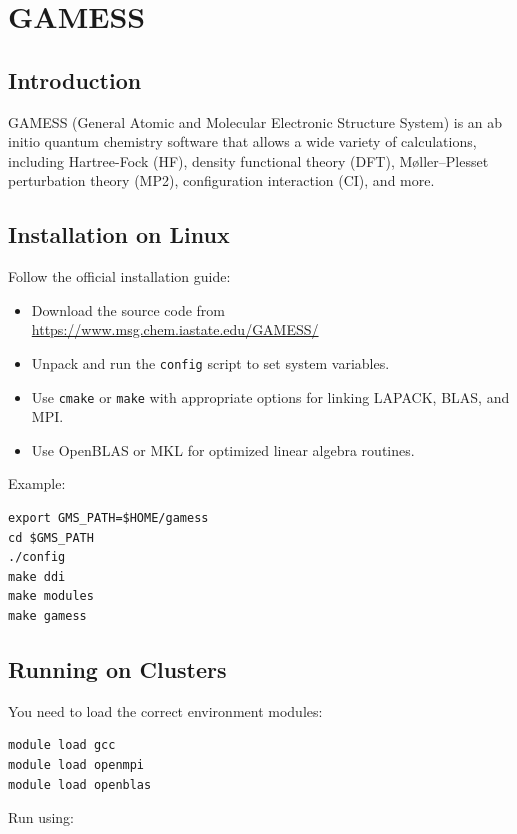 \chapter{GAMESS}

\section{Introduction}

GAMESS (General Atomic and Molecular Electronic Structure System) is an ab initio quantum chemistry software that allows a wide variety of calculations, including Hartree-Fock (HF), density functional theory (DFT), Møller–Plesset perturbation theory (MP2), configuration interaction (CI), and more.

\section{Installation on Linux}

Follow the official installation guide:

\begin{itemize}
  \item Download the source code from \url{https://www.msg.chem.iastate.edu/GAMESS/}
  \item Unpack and run the \texttt{config} script to set system variables.
  \item Use \texttt{cmake} or \texttt{make} with appropriate options for linking LAPACK, BLAS, and MPI.
  \item Use OpenBLAS or MKL for optimized linear algebra routines.
\end{itemize}

Example:

\begin{verbatim}
export GMS_PATH=$HOME/gamess
cd $GMS_PATH
./config
make ddi
make modules
make gamess
\end{verbatim}

\section{Running on Clusters}

You need to load the correct environment modules:

\begin{verbatim}
module load gcc
module load openmpi
module load openblas
\end{verbatim}

Run using:

